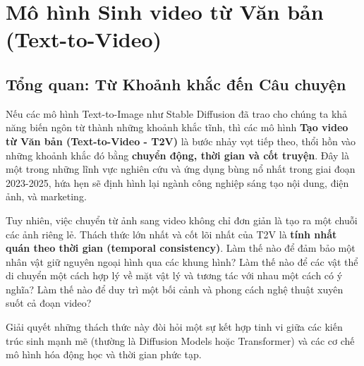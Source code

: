 \section{Mô hình Sinh video từ Văn bản (Text-to-Video)}
\label{sec:text_to_video}

\subsection{Tổng quan: Từ Khoảnh khắc đến Câu chuyện}
\label{subsec:t2v_overview}
Nếu các mô hình Text-to-Image như Stable Diffusion đã trao cho chúng ta khả năng biến ngôn từ thành những khoảnh khắc tĩnh, thì các mô hình \textbf{Tạo video từ Văn bản (Text-to-Video - T2V)} là bước nhảy vọt tiếp theo, thổi hồn vào những khoảnh khắc đó bằng \textbf{chuyển động, thời gian và cốt truyện}. Đây là một trong những lĩnh vực nghiên cứu và ứng dụng bùng nổ nhất trong giai đoạn 2023-2025, hứa hẹn sẽ định hình lại ngành công nghiệp sáng tạo nội dung, điện ảnh, và marketing.

Tuy nhiên, việc chuyển từ ảnh sang video không chỉ đơn giản là tạo ra một chuỗi các ảnh riêng lẻ. Thách thức lớn nhất và cốt lõi nhất của T2V là \textbf{tính nhất quán theo thời gian (temporal consistency)}. Làm thế nào để đảm bảo một nhân vật giữ nguyên ngoại hình qua các khung hình? Làm thế nào để các vật thể di chuyển một cách hợp lý về mặt vật lý và tương tác với nhau một cách có ý nghĩa? Làm thế nào để duy trì một bối cảnh và phong cách nghệ thuật xuyên suốt cả đoạn video?

Giải quyết những thách thức này đòi hỏi một sự kết hợp tinh vi giữa các kiến trúc sinh mạnh mẽ (thường là Diffusion Models hoặc Transformer) và các cơ chế mô hình hóa động học và thời gian phức tạp.


